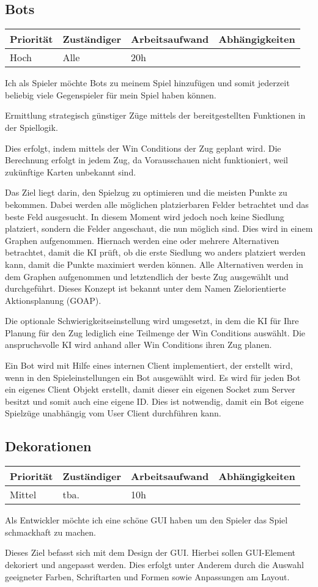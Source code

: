 \documentclass[a4paper]{scrreprt}
\newenvironment{requirement}[5] {
	\subsection{#1}
	\begin{tabularx}{\textwidth}{|X|l|X|X|}
		\hline
		Priorität & Zuständiger & Arbeitsaufwand & Abhängigkeiten \\
		\hline
		#2 & #3 & #4 & #5 \\
		\hline
	\end{tabularx}
	}{
	\newpage
	}
\begin{document}
\begin{requirement}{Bots}{Hoch}{Alle}{20h}{}

\begin{center}
Ich als Spieler möchte Bots zu meinem Spiel hinzufügen und somit jederzeit beliebig viele Gegenspieler für mein Spiel haben können.
\end{center}

Ermittlung strategisch günstiger Züge mittels der bereitgestellten Funktionen in der Spiellogik.

Dies erfolgt, indem mittels der Win Conditions der Zug geplant wird. Die Berechnung erfolgt in jedem Zug, da Vorausschauen nicht funktioniert, weil zukünftige Karten unbekannt sind.

Das Ziel liegt darin, den Spielzug zu optimieren und die meisten Punkte zu bekommen. Dabei werden alle möglichen platzierbaren Felder betrachtet und das beste Feld ausgesucht. In diesem Moment wird jedoch noch keine Siedlung platziert, sondern die Felder angeschaut, die nun möglich sind. Dies wird in einem Graphen aufgenommen. Hiernach werden eine oder mehrere Alternativen betrachtet, damit die KI prüft, ob die erste Siedlung wo anders platziert werden kann, damit die Punkte maximiert werden können. Alle Alternativen werden in dem Graphen aufgenommen und letztendlich der beste Zug ausgewählt und durchgeführt. Dieses Konzept ist bekannt unter dem Namen Zielorientierte Aktionsplanung (GOAP).

Die optionale Schwierigkeitseinstellung wird umgesetzt, in dem die KI für Ihre Planung für den Zug lediglich eine Teilmenge der Win Conditions auswählt. Die anspruchsvolle KI wird anhand aller Win Conditions ihren Zug planen.

Ein Bot wird mit Hilfe eines internen Client implementiert, der erstellt wird, wenn in den Spieleinstellungen ein Bot ausgewählt wird. Es wird für jeden Bot ein eigenes Client Objekt erstellt, damit dieser ein eigenen Socket zum Server besitzt und somit auch eine eigene ID. Dies ist notwendig, damit ein Bot eigene Spielzüge unabhängig vom User Client durchführen kann.

\end{requirement}


\begin{requirement}{Dekorationen}{Mittel}{tba.}{10h}{}

\begin{center}
	Als Entwickler möchte ich eine \glqq schöne \grqq{} GUI haben um den Spieler das Spiel schmackhaft zu machen.
\end{center}

Dieses Ziel befasst sich mit dem Design der GUI. Hierbei sollen GUI-Element dekoriert und angepasst werden. Dies erfolgt unter Anderem durch die Auswahl geeigneter Farben, Schriftarten und Formen sowie Anpassungen am Layout.


\end{requirement}
\end{document}
